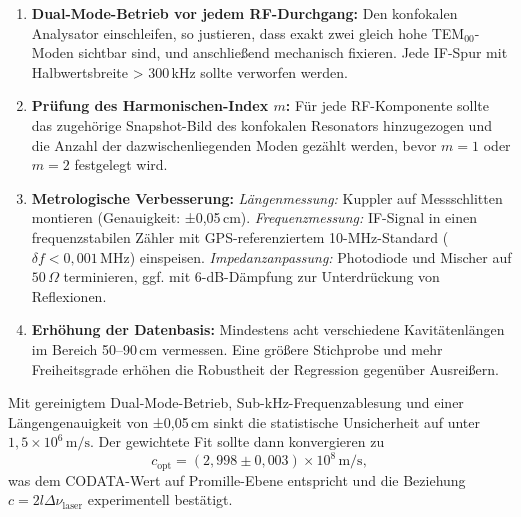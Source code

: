 \begin{enumerate}
  \item \textbf{Dual-Mode-Betrieb vor jedem RF-Durchgang:}  
    Den konfokalen Analysator einschleifen, so justieren, dass exakt zwei gleich hohe TEM\(_{00}\)-Moden sichtbar sind, und anschließend mechanisch fixieren. 
    Jede IF-Spur mit Halbwertsbreite > 300\,kHz sollte verworfen werden.

  \item \textbf{Prüfung des Harmonischen-Index \(m\):}  
    Für jede RF-Komponente sollte das zugehörige Snapshot-Bild des konfokalen Resonators hinzugezogen und die Anzahl der dazwischenliegenden Moden gezählt werden, bevor \(m = 1\) oder \(m = 2\) festgelegt wird.

  \item \textbf{Metrologische Verbesserung:}  
    \emph{Längenmessung:} Kuppler auf Messschlitten montieren (Genauigkeit: ±0{,}05\,cm).  
    \emph{Frequenzmessung:} IF-Signal in einen frequenzstabilen Zähler mit GPS-referenziertem 10-MHz-Standard (\(\delta f < 0{,}001\,\mathrm{MHz}\)) einspeisen.  
    \emph{Impedanzanpassung:} Photodiode und Mischer auf \(50\,\Omega\) terminieren, ggf. mit 6-dB-Dämpfung zur Unterdrückung von Reflexionen.

  \item \textbf{Erhöhung der Datenbasis:}  
    Mindestens acht verschiedene Kavitätenlängen im Bereich 50–90\,cm vermessen. Eine größere Stichprobe und mehr Freiheitsgrade erhöhen die Robustheit der Regression gegenüber Ausreißern.
\end{enumerate}

Mit gereinigtem Dual-Mode-Betrieb, Sub-kHz-Frequenzablesung und einer Längengenauigkeit von ±0{,}05\,cm sinkt die statistische Unsicherheit auf unter \(1{,}5\times10^6\,\mathrm{m/s}\). 
Der gewichtete Fit sollte dann konvergieren zu  
\[
  c_{\mathrm{opt}} = (2{,}998 \pm 0{,}003)\times10^{8}\,\mathrm{m/s},
\] 
was dem CODATA-Wert auf Promille-Ebene entspricht und die Beziehung \(c = 2l\Delta\nu_{\mathrm{laser}}\) experimentell bestätigt.